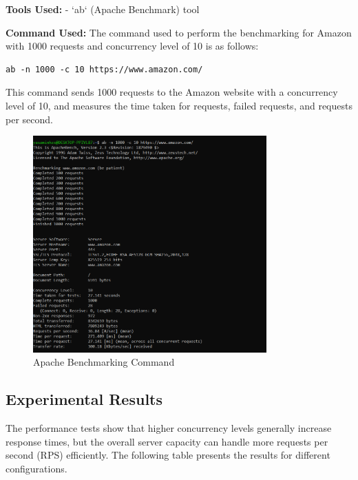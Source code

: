 \documentclass[a4paper,10pt]{article}
\begin{document}
\textbf{Tools Used:}
- `ab` (Apache Benchmark) tool

\textbf{Command Used:}
The command used to perform the benchmarking for Amazon with 1000 requests and concurrency level of 10 is as follows:

\begin{verbatim}
ab -n 1000 -c 10 https://www.amazon.com/
\end{verbatim}

This command sends 1000 requests to the Amazon website with a concurrency level of 10, and measures the time taken for requests, failed requests, and requests per second.

\begin{figure}[ht]
\centering
\includegraphics[width=0.8\textwidth]{shot1.png} 
\caption{Apache Benchmarking Command}
\label{fig:apache_benchmark_command}
\end{figure}

\subsection{Experimental Results}
The performance tests show that higher concurrency levels generally increase response times, but the overall server capacity can handle more requests per second (RPS) efficiently. The following table presents the results for different configurations.
\end{document}

